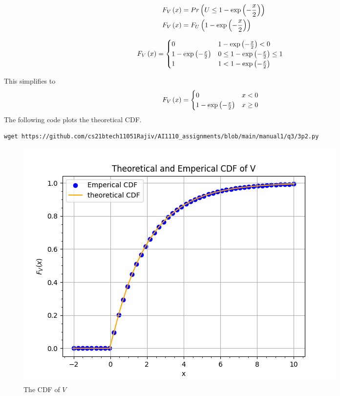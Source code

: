 \documentclass[journal,12pt,twocolumn]{IEEEtran}
\renewcommand\thesection{\arabic{section}}
\begin{document}
\begin{enumerate}[label=\thesection.\arabic*
,ref=\thesection.\theenumi]
\begin{align}
	F_V\left(x\right) &= Pr\left(U \le 1- \exp{\ensuremath{\left(-\frac{x}{2}\right)} }\right) \\
	F_V\left(x\right) &= F_U\left(1- \exp{\ensuremath{\left(-\frac{x}{2}\right)} }\right)		
\end{align}
\begin{small}
\begin{align}
	F_V\left(x\right) &=
    \begin{cases}  
        0 & 1- \exp{\ensuremath{\left(-\frac{x}{2}\right)} } < 0\\
        1- \exp{\ensuremath{\left(-\frac{x}{2}\right)} } & 0 \le 1- \exp{\ensuremath{\left(-\frac{x}{2}\right)} } \le 1 \\
        1 & 1 < 1- \exp{\ensuremath{\left(-\frac{x}{2}\right)} }
    \end{cases}
\end{align}
\end{small}
This simplifies to
\begin{align}
	F_V\left(x\right) &=
    \begin{cases}  
        0 & x < 0\\
        1- \exp{\ensuremath{\left(-\frac{x}{2}\right)}} & x \ge 0
    \end{cases}
    \label{eq:F_V}
\end{align}
The following code plots the theoretical CDF.
\begin{lstlisting}
wget https://github.com/cs21btech11051Rajiv/AI1110_assignments/blob/main/manual1/q3/3p2.py
\end{lstlisting}
\begin{figure}
\centering
\includegraphics[width=\columnwidth]{./figs/fig3.2.png}
\caption{The CDF of $V$}
\label{fig:theory_misc_cdf}
\end{figure}

\end{enumerate}
\end{document}
